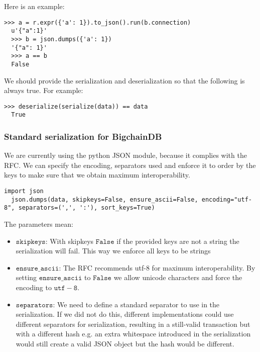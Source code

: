\medskip
\noindent Here is an example:

\begin{minipage}{\linewidth}
  \begin{lstlisting}[style=python]
  >>> a = r.expr({'a': 1}).to_json().run(b.connection)
  u'{"a":1}'
  >>> b = json.dumps({'a': 1}) 
  '{"a": 1}' 
  >>> a == b 
  False\end{lstlisting}
\end{minipage}

\medskip
\noindent We should provide the serialization and deserialization so that the following is always true.
\medskip
\noindent For example: 

\begin{minipage}{\linewidth}
  \begin{lstlisting}[style=python]
  >>> deserialize(serialize(data)) == data 
  True\end{lstlisting}
\end{minipage}


\subsubsection{Standard serialization for BigchainDB}
We are currently using the python JSON module, because it complies with the RFC.
We can specify the encoding, separators used and enforce it to order by the keys to make sure that we obtain maximum interoperability. 

\begin{minipage}{\linewidth}
  \begin{lstlisting}[style=python]
  import json 
  json.dumps(data, skipkeys=False, ensure_ascii=False, encoding="utf-8", separators=(',', ':'), sort_keys=True)\end{lstlisting}
\end{minipage}

\noindent The parameters mean: 
\begin{itemize}
 \item $\mathtt{skipkeys}$: With skipkeys $\mathtt{False}$ if the provided keys are not a string the serialization will fail. This way we enforce all keys to be strings
 \item $\mathtt{ensure\_ascii}$: The RFC recommends utf-8 for maximum interoperability. By setting $\mathtt{ensure\_ascii}$ to $\mathtt{False}$ we allow unicode characters and force the encoding to $\mathtt{utf-8}$. 
 \item $\mathtt{separators}$: We need to define a standard separator to use in the serialization. If we did not do this, different implementations could use different separators for serialization, resulting in a still-valid transaction but with a different hash e.g. an extra whitespace introduced in the serialization would still create a valid JSON object but the hash would be different.
\end{itemize}

